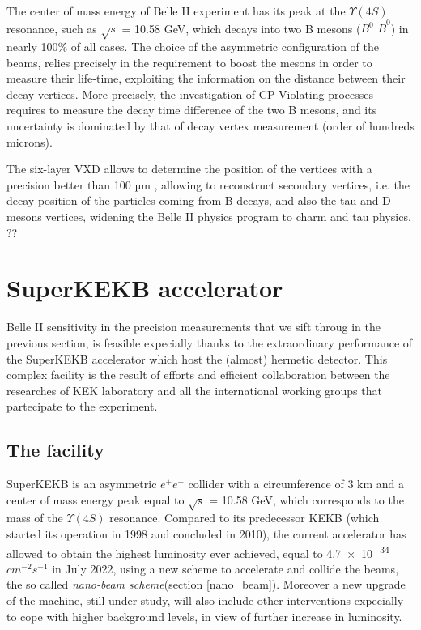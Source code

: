 The center of mass energy of Belle II experiment has its peak at the $\Upsilon(4S)$ resonance, such as $\sqrt{s}$ = 10.58 GeV, which decays into two B mesons ($B^{0}$ $\bar{B}^{0}$) in nearly 100\% of all cases. The choice of the asymmetric configuration of the beams, relies precisely in the requirement to boost the mesons in order to measure their life-time, exploiting the information on the distance between their decay vertices. More precisely, the investigation of CP Violating processes requires to measure the decay time difference of the two B mesons, and its uncertainty is dominated by that of decay vertex measurement (order of hundreds microns). 




The six-layer VXD allows to determine the position of the vertices with a precision better than 100 µm
, allowing to reconstruct secondary vertices, i.e. the decay position of the particles coming from B decays, and also the tau and D mesons vertices, widening the Belle II physics program to charm and tau physics.  ??








\section{SuperKEKB accelerator}

Belle II sensitivity in the precision measurements that we sift throug in the previous section, is feasible expecially thanks to the extraordinary performance of the SuperKEKB accelerator which host the (almost) hermetic detector. This complex facility is the result of efforts and efficient collaboration between the researches of KEK laboratory and all the international working groups that partecipate to the experiment.


\subsection{The facility}

SuperKEKB is an asymmetric $e^{+}e^{-}$ collider with a circumference of 3 km and a center of mass energy peak equal to  $\sqrt{s}$ = 10.58 GeV, which corresponds to the mass of the $\Upsilon(4S)$ resonance.
Compared to its predecessor KEKB (which started its operation in 1998 and concluded in 2010), the current accelerator has allowed to obtain the highest luminosity ever achieved, equal to \num{4.7e-34} $cm^{-2}s^{-1}$ in July 2022, using a new scheme to accelerate and collide the beams, the so called \textit{nano-beam scheme}(section \vref{nano_beam}). Moreover a new upgrade of the machine, still under study, will also include other interventions expecially to cope with higher background levels, in view of further increase in luminosity.

